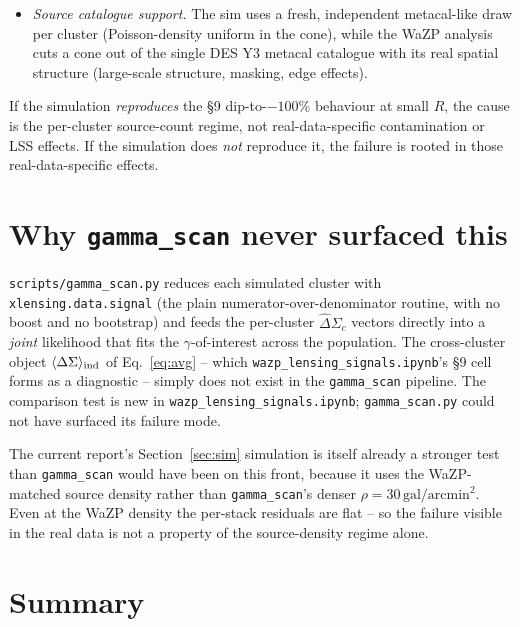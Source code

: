 \documentclass[11pt,a4paper]{article}
\newcommand{\DS}{\Delta\Sigma}
\begin{document}
\begin{description}
\begin{itemize}
      pure shear field on a uniform source catalogue; the true boost is
      $B \equiv 1$.  The real WaZP cones include cluster members in
      the inner bins, so the real $B(R)$ rises above unity at small
      $R$ and contributes its own scatter to the per-cluster
      bootstrap.
\item \emph{Source catalogue support.}  The sim uses a fresh,
      independent metacal-like draw per cluster (Poisson-density
      uniform in the cone), while the WaZP analysis cuts a cone out of
      the single DES Y3 metacal catalogue with its real spatial
      structure (large-scale structure, masking, edge effects).
\end{itemize}
\end{description}

If the simulation \emph{reproduces} the §9 dip-to-$-100\%$ behaviour
at small $R$, the cause is the per-cluster source-count regime, not
real-data-specific contamination or LSS effects.  If the simulation
does \emph{not} reproduce it, the failure is rooted in those
real-data-specific effects.


\section{Why \texttt{gamma\_scan} never surfaced this}
\label{sec:gammascan}

\verb|scripts/gamma_scan.py| reduces each simulated cluster with
\verb|xlensing.data.signal| (the plain numerator-over-denominator
routine, with no boost and no bootstrap) and feeds the per-cluster
$\widehat\DS_c$ vectors directly into a \emph{joint} likelihood that
fits the $\gamma$-of-interest across the population.  The cross-cluster
object $\langle\DS\rangle_{\rm ind}$ of Eq.~\eqref{eq:avg} -- which
\verb|wazp_lensing_signals.ipynb|'s §9 cell forms as a diagnostic --
simply does not exist in the \verb|gamma_scan| pipeline.  The
comparison test is new in \verb|wazp_lensing_signals.ipynb|;
\verb|gamma_scan.py| could not have surfaced its failure mode.

The current report's Section~\ref{sec:sim} simulation is itself
already a stronger test than \verb|gamma_scan| would have been on this
front, because it uses the WaZP-matched source density rather than
\verb|gamma_scan|'s denser $\rho = 30\,\mathrm{gal}/\mathrm{arcmin}^{2}$.
Even at the WaZP density the per-stack residuals are flat -- so the
failure visible in the real data is not a property of the
source-density regime alone.


\section{Summary}
\end{document}
